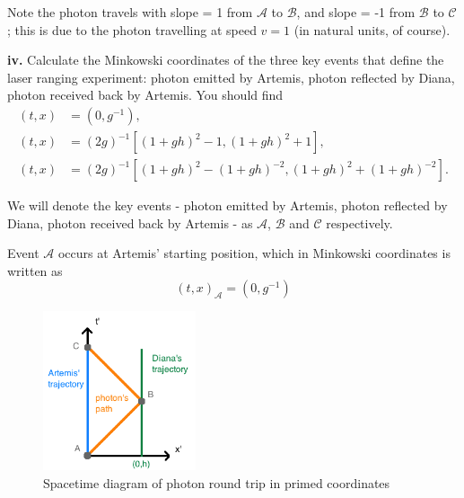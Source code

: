 \documentclass[a4paper]{article} %
\begin{document}
Note the photon travels with slope = 1 from $\mathcal{A}$ to $\mathcal{B}$, and slope = -1 from $\mathcal{B}$ to $\mathcal{C}$; this is due to the photon travelling at speed $v=1$ (in natural units, of course).

\begin{framed}
\textbf{iv.} Calculate the Minkowski coordinates of the three key events that define the laser ranging experiment: photon emitted by Artemis, photon reflected by Diana, photon received back by Artemis. You should find
\begin{align}
(t,x)&=(0,g^{-1}),\\
(t,x)&=(2g)^{-1}[(1+gh)^2-1,(1+gh)^2+1],\\
(t,x)&=(2g)^{-1}[(1+gh)^2-(1+gh)^{-2},(1+gh)^2+(1+gh)^{-2}].
\end{align}
\end{framed}

We will denote the key events - photon emitted by Artemis, photon reflected by Diana, photon received back by Artemis - as $\mathcal{A}$, $\mathcal{B}$ and $\mathcal{C}$ respectively.

Event $\mathcal{A}$ occurs at Artemis' starting position, which in Minkowski coordinates is written as
\begin{equation}
(t,x)_{\mathcal{A}}=(0,g^{-1})
\end{equation}

\begin{figure}[h]
\centering
\includegraphics[width=0.4\textwidth]{images/photon_round_trip_primed.png}
\caption{Spacetime diagram of photon round trip in primed coordinates}
\label{photon round trip primed diagram}
\end{figure}
\end{document}
